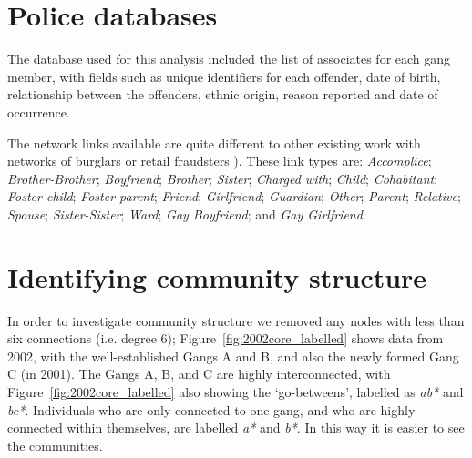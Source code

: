 \documentclass[conference]{IEEEtran}
\theoremstyle{definition}
\begin{document}
\section{Police databases}\label{sec:policedatabases}

The database used for this analysis included the list of associates
for each gang member, with fields such as unique identifiers for each
offender, date of birth, relationship between the offenders, ethnic
origin, reason reported and date of occurrence.

The network links available are quite different to other existing work
with networks of burglars or retail fraudsters
\cite{OatleyZeleznikowLearyEwart2005,OatleyMcGarryEwart2006}). These link
types are: \emph{Accomplice}; \emph{Brother-Brother};
\emph{Boyfriend}; \emph{Brother}; \emph{Sister}; \emph{Charged with};
\emph{Child}; \emph{Cohabitant}; \emph{Foster child}; \emph{Foster
parent}; \emph{Friend}; \emph{Girlfriend}; \emph{Guardian};
\emph{Other}; \emph{Parent}; \emph{Relative}; \emph{Spouse};
\emph{Sister-Sister}; \emph{Ward}; \emph{Gay Boyfriend}; and \emph{Gay
Girlfriend}.



\section{Identifying community structure}\label{sec:communitystructure}
In order to investigate community structure we removed any nodes with
less than six connections (i.e. degree 6);
Figure~\ref{fig:2002core_labelled} shows data from 2002, with the
well-established Gangs A and B, and also the newly formed Gang C (in
2001). The Gangs A, B, and C are highly interconnected, with
Figure~\ref{fig:2002core_labelled} also showing the `go-betweens',
labelled as \emph{ab*} and \emph{bc*}. Individuals who are only
connected to one gang, and who are highly connected within themselves,
are labelled \emph{a*} and \emph{b*}. In this way it is easier to see
the communities.
\end{document}
